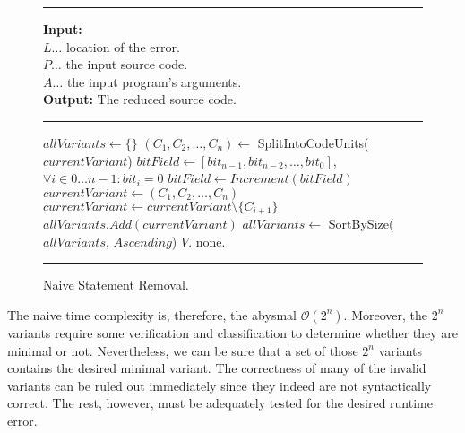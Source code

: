 \begin{figure}[h]
	\hrule height.8pt depth0pt \kern2pt
	\textbf{Input:} \\
	\hspace*{\algorithmicindent} $L \ldots$ location of the error. \\
	\hspace*{\algorithmicindent} $P \ldots$ the input source code. \\
	\hspace*{\algorithmicindent} $A \ldots$ the input program's arguments. \\
	\textbf{Output:} The reduced source code. 
	\hrule height.8pt depth0pt \kern2pt
	\begin{algorithmic}[1]
		\State $allVariants \leftarrow \{\}$
		\State $(C_1, C_2, \ldots, C_n) \leftarrow$ SplitIntoCodeUnits($currentVariant$)
		\State $bitField \leftarrow [{bit}_{n-1}, {bit}_{n-2}, \ldots, {bit}_0]$,  
			$\forall i \in 0 \ldots n-1 : bit_i = 0$
			\State $bitField \leftarrow Increment(bitField)$
			\State $currentVariant \leftarrow (C_1, C_2, \ldots, C_n)$
					\State $currentVariant \leftarrow currentVariant \setminus \{C_{i+1}\}$
				\EndIf
			\EndFor
			\State $allVariants.Add(currentVariant)$
		\EndWhile
		\State $allVariants \leftarrow$ SortBySize($allVariants$, $Ascending$)
				\Return $V$.
			\EndIf
		\EndFor
		\State \Return none.
	\end{algorithmic} 
	\hrule height.8pt depth0pt \kern2pt
	\caption{Naive Statement Removal.} 
	\label{alg:naive}
\end{figure}

The naive time complexity is, therefore, the abysmal $\mathcal{O}(2^n)$.
Moreover, the $2^n$ variants require some verification and classification 
to determine whether they are minimal or not.
Nevertheless, we can be sure that a set of those $2^n$ variants contains 
the desired minimal variant.
The correctness of many of the invalid variants can be ruled out immediately
since they indeed are not syntactically correct.
The rest, however, must be adequately tested for the desired runtime error.

